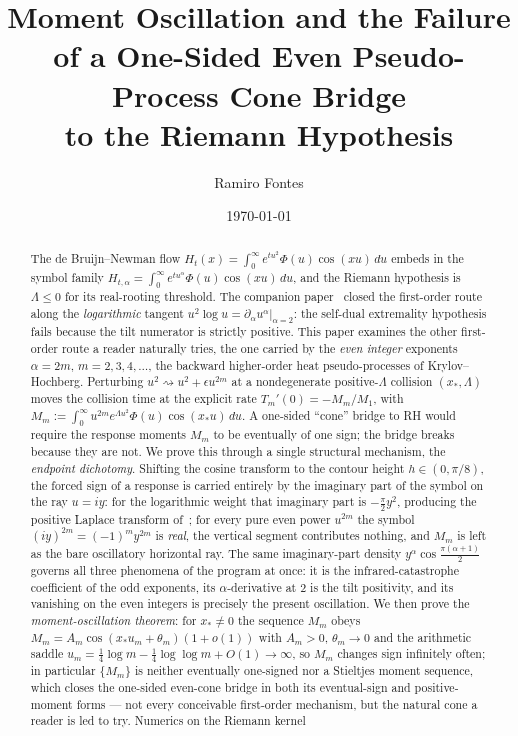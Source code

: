 \documentclass[11pt,reqno]{amsart}
\title[Failure of the even-cone bridge to RH]{Moment Oscillation and the
Failure of a One-Sided Even Pseudo-Process Cone Bridge\\ to the Riemann
Hypothesis}
\author{Ramiro Fontes}
\date{\today}
\theoremstyle{plain}
\theoremstyle{definition}
\theoremstyle{remark}
\begin{document}
\begin{abstract}
The de Bruijn--Newman flow $H_{t}(x)=\int_0^\infty
e^{tu^2}\Phi(u)\cos(xu)\,du$ embeds in the symbol family
$H_{t,\alpha}=\int_0^\infty e^{tu^\alpha}\Phi(u)\cos(xu)\,du$, and the
Riemann hypothesis is $\Lambda\le0$ for its real-rooting threshold. The
companion paper~\cite{Fsymbol} closed the first-order route along the
\emph{logarithmic} tangent $u^2\log u=\partial_\alpha u^\alpha|_{\alpha=2}$:
the self-dual extremality hypothesis fails because the tilt numerator is
strictly positive. This paper examines the other first-order route a reader
naturally tries, the one carried by the \emph{even integer} exponents
$\alpha=2m$, $m=2,3,4,\dots$, the backward higher-order heat
pseudo-processes of Krylov--Hochberg. Perturbing $u^2\rightsquigarrow
u^2+\epsilon u^{2m}$ at a nondegenerate positive-$\Lambda$ collision
$(x_*,\Lambda)$ moves the collision time at the explicit rate
$T_m'(0)=-M_m/M_1$, with $M_m:=\int_0^\infty
u^{2m}e^{\Lambda u^2}\Phi(u)\cos(x_*u)\,du$. A one-sided ``cone'' bridge to
RH would require the response moments $M_m$ to be eventually of one sign;
the bridge breaks because they are not. We prove this through a single
structural mechanism, the \emph{endpoint dichotomy}. Shifting the cosine
transform to the contour height $h\in(0,\pi/8)$, the forced sign of a
response is carried entirely by the imaginary part of the symbol on the
ray $u=iy$: for the logarithmic weight that imaginary part is $-\tfrac\pi2
y^2$, producing the positive Laplace transform of~\cite{Fsymbol}; for every
pure even power $u^{2m}$ the symbol $(iy)^{2m}=(-1)^my^{2m}$ is \emph{real},
the vertical segment contributes nothing, and $M_m$ is left as the bare
oscillatory horizontal ray. The same imaginary-part density
$y^\alpha\cos\tfrac{\pi(\alpha+1)}2$ governs all three phenomena of the
program at once: it is the infrared-catastrophe coefficient of the odd
exponents, its $\alpha$-derivative at $2$ is the tilt positivity, and its
vanishing on the even integers is precisely the present oscillation. We
then prove the \emph{moment-oscillation theorem}: for $x_*\neq0$ the
sequence $M_m$ obeys $M_m=A_m\cos(x_*u_m+\theta_m)(1+o(1))$ with $A_m>0$,
$\theta_m\to0$ and the arithmetic saddle $u_m=\tfrac14\log m-\tfrac14\log\log
m+O(1)\to\infty$, so $M_m$ changes sign infinitely often; in particular
$\{M_m\}$ is neither eventually one-signed nor a Stieltjes moment sequence,
which closes the one-sided even-cone bridge in both its eventual-sign and
positive-moment forms --- not every conceivable first-order mechanism, but
the natural cone a reader is led to try. Numerics on the Riemann kernel

\end{abstract}
\end{document}
